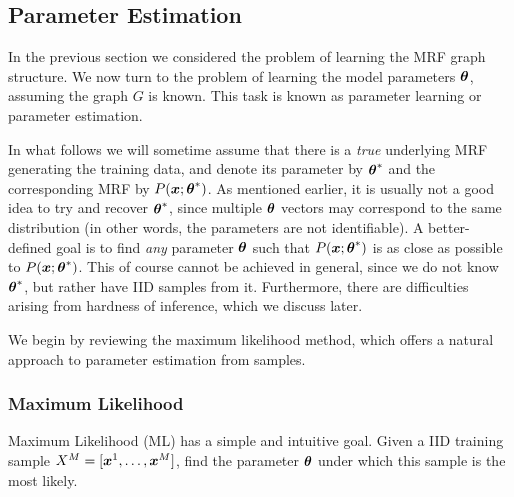 \subsection{Parameter Estimation}
In the previous section we considered the problem of learning the MRF graph structure. We now turn to the problem of learning the model parameters $\boldsymbol{\theta}$, assuming the graph $G$ is known. This task is known as parameter learning or parameter estimation.

In what follows we will sometime assume that there is a {\em true} underlying MRF generating the training data, and denote its parameter by ${\boldsymbol{\theta}}^{*}$ and the corresponding MRF by $P(\boldsymbol{x}; {\boldsymbol{\theta}}^{*})$. As mentioned earlier, it is usually not a good idea to try and recover ${\boldsymbol{\theta}}^{*}$, since multiple $\boldsymbol{\theta}$ vectors may correspond to the same distribution (in other words, the parameters are not identifiable). A better-defined goal is to find {\em any} parameter $\boldsymbol{\theta}$ such that $P(\boldsymbol{x}; {\boldsymbol{\theta}}^{*})$ is as close as possible to $P(\boldsymbol{x}; {\boldsymbol{\theta}}^{*})$. This of course cannot be achieved in general, since we do not know ${\boldsymbol{\theta}}^{*}$,  but rather have IID samples from it. Furthermore, there are difficulties arising from hardness of inference, which we discuss later.

We begin by reviewing the maximum likelihood method, which offers a natural approach to parameter estimation from samples.




\subsubsection{Maximum Likelihood}
\label{sec:max_likelihood}
Maximum Likelihood (ML) has a simple and intuitive goal. Given a IID training sample  $X^M = [\boldsymbol{x}^1, \ldots, \boldsymbol{x}^{M}]$, find the parameter $\boldsymbol{\theta}$ under which 
this sample is the most likely. 


